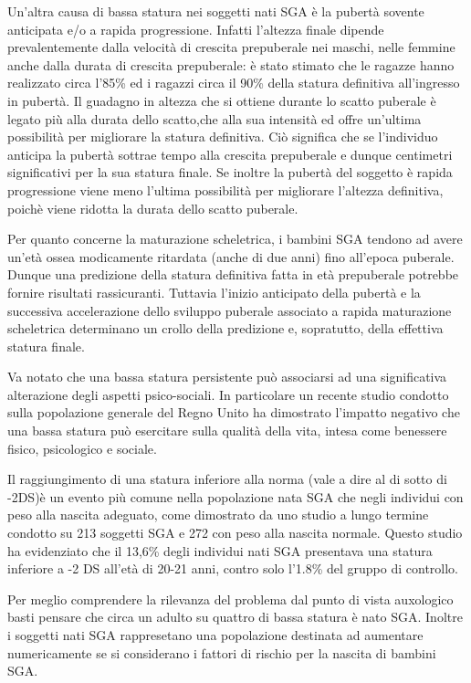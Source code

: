 Un'altra causa di bassa statura nei soggetti nati SGA è la pubertà sovente anticipata e/o a rapida progressione\cite{albertsson2000children}. 
Infatti l'altezza finale dipende prevalentemente dalla velocità di crescita prepuberale nei maschi, nelle femmine anche dalla durata di crescita prepuberale: è stato stimato che le ragazze hanno realizzato circa l'85\% ed i ragazzi circa il 90\% della statura definitiva all'ingresso in pubertà. Il guadagno in altezza che si ottiene durante lo scatto puberale è legato più alla durata dello scatto,che alla sua intensità ed offre un'ultima possibilità per migliorare la statura definitiva\cite{gasser1985human}. Ciò significa che se l'individuo anticipa la pubertà sottrae tempo alla crescita prepuberale e dunque centimetri significativi per la sua statura finale. Se inoltre la pubertà del soggetto è rapida progressione viene meno l'ultima possibilità per migliorare l'altezza definitiva, poichè viene ridotta la durata dello scatto puberale. 

Per quanto concerne la maturazione scheletrica, i bambini SGA tendono ad avere un'età ossea modicamente ritardata (anche di due anni) fino all'epoca puberale. Dunque una predizione della statura definitiva fatta in età prepuberale potrebbe fornire risultati rassicuranti. Tuttavia l'inizio anticipato della pubertà e la successiva accelerazione dello sviluppo puberale associato a rapida maturazione scheletrica determinano un crollo della predizione e, sopratutto, della effettiva statura finale\cite{job1986histoire}.

Va notato che una bassa statura persistente può associarsi ad una significativa alterazione degli aspetti psico-sociali. In particolare un recente studio condotto sulla popolazione generale del Regno Unito ha dimostrato l'impatto negativo che una bassa statura può esercitare sulla qualità della vita, intesa come benessere fisico, psicologico e sociale\cite{christensen2007evaluation}. 
 
Il raggiungimento di una statura inferiore alla norma (vale a dire al di sotto di -2DS)è un evento più comune nella popolazione nata SGA che negli individui con peso alla nascita adeguato, come dimostrato da uno studio a lungo termine condotto su 213 soggetti SGA e 272 con peso alla nascita normale. Questo studio ha evidenziato che il 
13,6\% degli individui nati SGA presentava una statura inferiore a -2 DS all'età di
20-21 anni, contro solo l'1.8\% del gruppo di controllo.\cite{leger1997reduced}

Per meglio comprendere la rilevanza del problema dal punto di vista auxologico basti pensare che circa un adulto su quattro di bassa statura è nato SGA.
Inoltre i soggetti nati SGA rappresetano una popolazione destinata ad aumentare numericamente se si considerano i fattori di rischio per la nascita di bambini SGA.  



  


 










